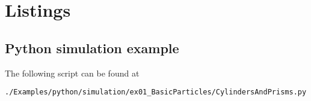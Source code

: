 

\chapter{Listings}

%
\section{Python simulation example} \label{PythonSimulationExampleScript}
The following script can be found at
\begin{lstlisting}[language=shell, style=commandline]
./Examples/python/simulation/ex01_BasicParticles/CylindersAndPrisms.py
\end{lstlisting}


